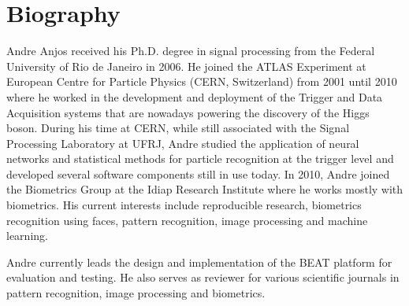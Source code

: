 \section{Biography}

Andre Anjos received his Ph.D. degree in signal processing from the Federal
University of Rio de Janeiro in 2006. He joined the ATLAS Experiment at
European Centre for Particle Physics (CERN, Switzerland) from 2001 until 2010
where he worked in the development and deployment of the Trigger and Data
Acquisition systems that are nowadays powering the discovery of the Higgs
boson. During his time at CERN, while still associated with the Signal
Processing Laboratory at UFRJ, Andre studied the application of neural networks
and statistical methods for particle recognition at the trigger level and
developed several software components still in use today. In 2010, Andre joined
the Biometrics Group at the Idiap Research Institute where he works mostly with
biometrics. His current interests include reproducible research, biometrics
recognition using faces, pattern recognition, image processing and machine
learning.

Andre currently leads the design and implementation of the BEAT platform for
evaluation and testing. He also serves as reviewer for various scientific
journals in pattern recognition, image processing and biometrics.
